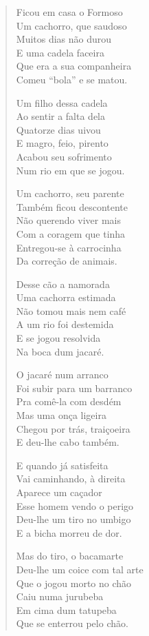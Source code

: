 \begin{verse}
Ficou em casa o Formoso\\
Um cachorro, que saudoso\\
Muitos dias não durou\\
E uma cadela faceira\\
Que era a sua companheira\\
Comeu “bola” e se matou.

Um filho dessa cadela\\
Ao sentir a falta dela\\
Quatorze dias uivou\\
E magro, feio, pirento\\
Acabou seu sofrimento\\
Num rio em que se jogou.

Um cachorro, seu parente\\
Também ficou descontente\\
Não querendo viver mais\\
Com a coragem que tinha\\
Entregou-se à carrocinha\\
Da correção de animais.

Desse cão a namorada\\
Uma cachorra estimada\\
Não tomou mais nem café\\
A um rio foi destemida\\
E se jogou resolvida\\
Na boca dum jacaré.
\pagebreak

O jacaré num arranco\\
Foi subir para um barranco\\
Pra comê-la com desdém\\
Mas uma onça ligeira\\
Chegou por trás, traiçoeira\\
E deu-lhe cabo também.

E quando já satisfeita\\
Vai caminhando, à direita\\
Aparece um caçador\\
Esse homem vendo o perigo\\
Deu-lhe um tiro no umbigo\\
E a bicha morreu de dor.

Mas do tiro, o bacamarte\\
Deu-lhe um coice com tal arte\\
Que o jogou morto no chão\\
Caiu numa jurubeba\\
Em cima dum tatupeba\\
Que se enterrou pelo chão.


\end{verse}

